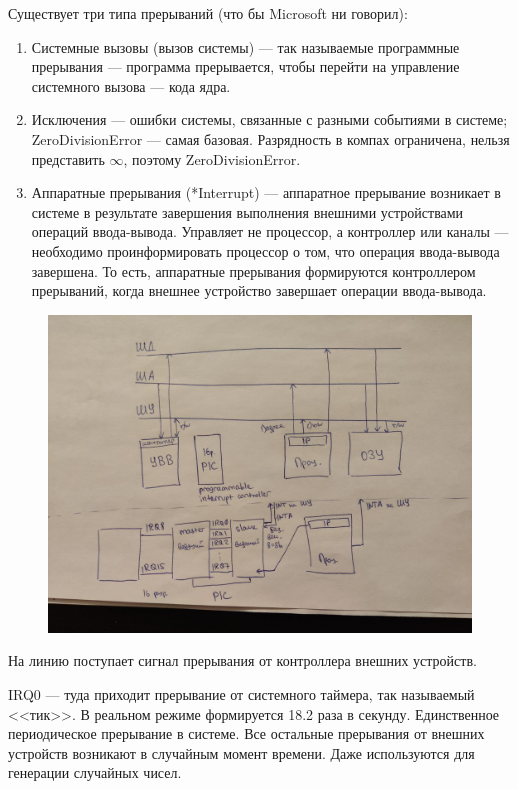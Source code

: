 Существует три типа прерываний (что бы Microsoft ни говорил):
\begin{enumerate}
    \item Системные вызовы (вызов системы) --- так называемые программные прерывания --- программа прерывается, чтобы перейти на управление системного вызова --- кода ядра.
    \item Исключения --- ошибки системы, связанные с разными событиями в системе; ZeroDivisionError --- самая базовая. Разрядность в компах ограничена, нельзя представить $\infty$, поэтому ZeroDivisionError.
    \item Аппаратные прерывания (*Interrupt) --- аппаратное прерывание возникает в системе в результате завершения выполнения внешними устройствами операций ввода-вывода. Управляет не процессор, а контроллер или каналы --- необходимо проинформировать процессор о том, что операция ввода-вывода завершена. То есть, аппаратные прерывания формируются контроллером прерываний, когда внешнее устройство завершает операции ввода-вывода.
\end{enumerate}

\begin{figure}[H]
	\centering
	\includegraphics[width=\textwidth]{img/tables/06.jpg}
\end{figure}

На линию поступает сигнал прерывания от контроллера внешних устройств.

IRQ0 --- туда приходит прерывание от системного таймера, так называемый <<тик>>.
В реальном режиме формируется 18.2 раза в секунду.
Единственное периодическое прерывание в системе.
Все остальные прерывания от внешних устройств возникают в случайным момент времени.
Даже используются для генерации случайных чисел.

